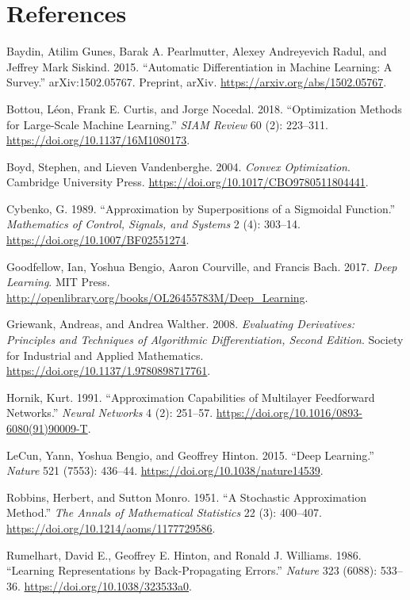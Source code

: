 \documentclass[
  english,
  11pt,
  a4paper,
  twoside,
  open=any,
  numbers=noenddot]{scrbook}
\newlength{\cslhangindent}
\newenvironment{CSLReferences}[2] %
 {\begin{list}{}{%
  \setlength{\itemindent}{0pt}
  \setlength{\leftmargin}{0pt}
  \setlength{\parsep}{0pt}
  \ifodd #1
   \setlength{\leftmargin}{\cslhangindent}
   \setlength{\itemindent}{-1\cslhangindent}
  \fi
  \setlength{\itemsep}{#2\baselineskip}}}
 {\end{list}}
\theoremstyle{plain}
\theoremstyle{plain}
\theoremstyle{plain}
\theoremstyle{definition}
\theoremstyle{definition}
\theoremstyle{definition}
\theoremstyle{remark}
\begin{document}
\chapter*{References}\label{references}


\protect{}\label{refs}
\begin{CSLReferences}{1}{1}
Baydin, Atilim Gunes, Barak A. Pearlmutter, Alexey Andreyevich Radul,
and Jeffrey Mark Siskind. 2015. {``Automatic Differentiation in Machine
Learning: A Survey.''} arXiv:1502.05767. Preprint, arXiv.
\url{https://arxiv.org/abs/1502.05767}.

Bottou, Léon, Frank E. Curtis, and Jorge Nocedal. 2018. {``Optimization
Methods for Large-Scale Machine Learning.''} \emph{SIAM Review} 60 (2):
223--311. \url{https://doi.org/10.1137/16M1080173}.

Boyd, Stephen, and Lieven Vandenberghe. 2004. \emph{Convex
Optimization}. Cambridge University Press.
\url{https://doi.org/10.1017/CBO9780511804441}.

Cybenko, G. 1989. {``Approximation by Superpositions of a Sigmoidal
Function.''} \emph{Mathematics of Control, Signals, and Systems} 2 (4):
303--14. \url{https://doi.org/10.1007/BF02551274}.

Goodfellow, Ian, Yoshua Bengio, Aaron Courville, and Francis Bach. 2017.
\emph{Deep Learning}. MIT Press.
\url{http://openlibrary.org/books/OL26455783M/Deep_Learning}.

Griewank, Andreas, and Andrea Walther. 2008. \emph{Evaluating
Derivatives: Principles and Techniques of Algorithmic Differentiation,
Second Edition}. Society for Industrial and Applied Mathematics.
\url{https://doi.org/10.1137/1.9780898717761}.

Hornik, Kurt. 1991. {``Approximation Capabilities of Multilayer
Feedforward Networks.''} \emph{Neural Networks} 4 (2): 251--57.
\url{https://doi.org/10.1016/0893-6080(91)90009-T}.

LeCun, Yann, Yoshua Bengio, and Geoffrey Hinton. 2015. {``Deep
Learning.''} \emph{Nature} 521 (7553): 436--44.
\url{https://doi.org/10.1038/nature14539}.

Robbins, Herbert, and Sutton Monro. 1951. {``A Stochastic Approximation
Method.''} \emph{The Annals of Mathematical Statistics} 22 (3):
400--407. \url{https://doi.org/10.1214/aoms/1177729586}.

Rumelhart, David E., Geoffrey E. Hinton, and Ronald J. Williams. 1986.
{``Learning Representations by Back-Propagating Errors.''} \emph{Nature}
323 (6088): 533--36. \url{https://doi.org/10.1038/323533a0}.

\end{CSLReferences}


\backmatter


\printindex
\end{document}

